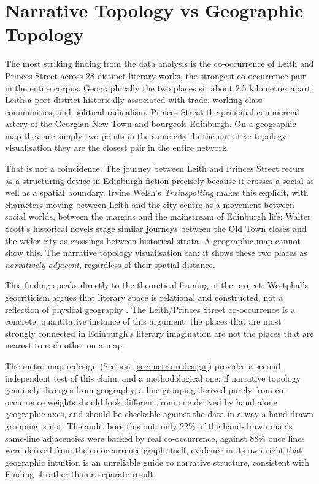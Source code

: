 \documentclass[logo,msc]{infthesis}
\begin{document}
\section{Narrative Topology vs Geographic Topology}
 
The most striking finding from the data analysis is the co-occurrence of Leith and Princes Street across 28 distinct literary works, the strongest co-occurrence pair in the entire corpus. Geographically the two places sit about 2.5 kilometres apart: Leith a port district historically associated with trade, working-class communities, and political radicalism, Princes Street the principal commercial artery of the Georgian New Town and bourgeois Edinburgh. On a geographic map they are simply two points in the same city. In the narrative topology visualisation they are the closest pair in the entire network.

That is not a coincidence. The journey between Leith and Princes Street recurs as a structuring device in Edinburgh fiction precisely because it crosses a social as well as a spatial boundary. Irvine Welsh's \textit{Trainspotting} makes this explicit, with characters moving between Leith and the city centre as a movement between social worlds, between the margins and the mainstream of Edinburgh life; Walter Scott's historical novels stage similar journeys between the Old Town closes and the wider city as crossings between historical strata. A geographic map cannot show this. The narrative topology visualisation can: it shows these two places as \emph{narratively adjacent}, regardless of their spatial distance.
 
This finding speaks directly to the theoretical framing of the project. Westphal's geocriticism argues that literary space is relational and constructed, not a reflection of physical geography \cite{westphal2011}. The Leith/Princes Street co-occurrence is a concrete, quantitative instance of this argument: the places that are most strongly connected in Edinburgh's literary imagination are not the places that are nearest to each other on a map.

The metro-map redesign (Section~\ref{sec:metro-redesign}) provides a second, independent test of this claim, and a methodological one: if narrative topology genuinely diverges from geography, a line-grouping derived purely from co-occurrence weights should look different from one derived by hand along geographic axes, and should be checkable against the data in a way a hand-drawn grouping is not. The audit bore this out: only 22\% of the hand-drawn map's same-line adjacencies were backed by real co-occurrence, against 88\% once lines were derived from the co-occurrence graph itself, evidence in its own right that geographic intuition is an unreliable guide to narrative structure, consistent with Finding~4 rather than a separate result.
\end{document}
